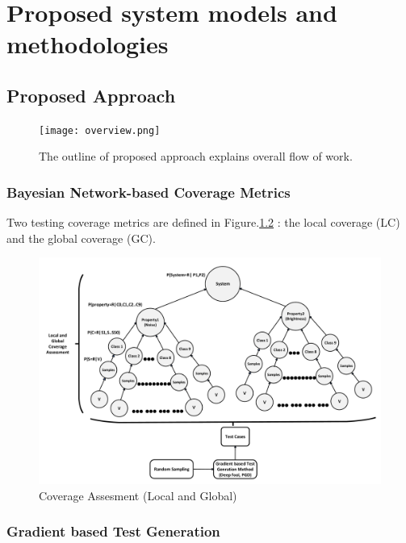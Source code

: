 \chapter[Proposed system models and methodologies]{Proposed system models and methodologies}
\label{chp:3}
\newpage

\section*{Proposed Approach}
\begin{figure}[h]
	\centering
	\texttt{[image: overview.png]}
	\caption{The outline of proposed approach explains overall flow of work.}
	\label{overview}
\end{figure}

\subsection{Bayesian Network-based Coverage Metrics}\hypertarget{Bayesian}{}
Two testing coverage metrics are defined in Figure.\ref{Coverage} : the local coverage (LC) and the global coverage (GC). 
\begin{figure}[h]
	\centering
	\includegraphics[width=1\textwidth]{ca.pdf}
	\caption{Coverage Assesment (Local and Global)}
	\label{Coverage}
\end{figure}

\subsection{Gradient based Test Generation}\hypertarget{Gradient}{}

